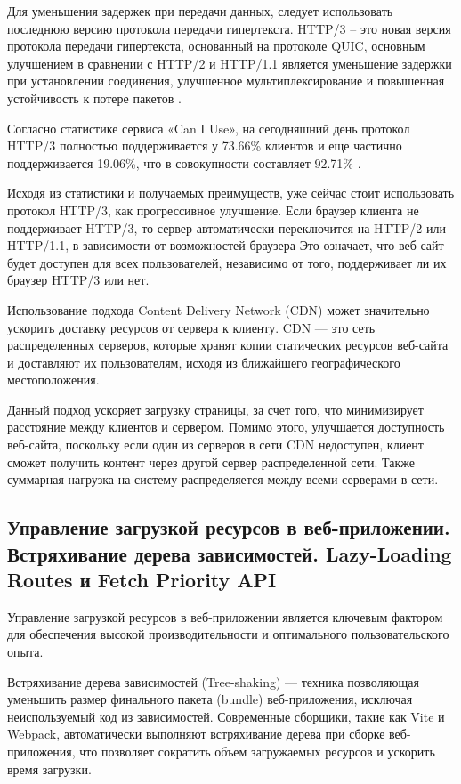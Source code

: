 Для уменьшения задержек при передачи данных, следует использовать последнюю версию протокола передачи гипертекста. HTTP/3 – это новая версия протокола передачи гипертекста, основанный на протоколе QUIC, основным улучшением в сравнении с HTTP/2 и HTTP/1.1 является уменьшение задержки при установлении соединения, улучшенное мультиплексирование и повышенная устойчивость к потере пакетов \cite{webserverhttp3}.

Согласно статистике сервиса «Can I Use», на сегодняшний день протокол HTTP/3 полностью поддерживается у 73.66\% клиентов и еще частично поддерживается 19.06\%, что в совокупности составляет 92.71\% \cite{caniusehttp3}.

Исходя из статистики и получаемых преимуществ, уже сейчас стоит использовать протокол HTTP/3, как прогрессивное улучшение. Если браузер клиента не поддерживает HTTP/3, то сервер автоматически переключится на HTTP/2 или HTTP/1.1, в зависимости от возможностей браузера Это означает, что веб-сайт будет доступен для всех пользователей, независимо от того, поддерживает ли их браузер HTTP/3 или нет.

Использование подхода Content Delivery Network (CDN) может значительно ускорить доставку ресурсов от сервера к клиенту. CDN — это сеть распределенных серверов, которые хранят копии статических ресурсов веб-сайта и доставляют их пользователям, исходя из ближайшего географического местоположения.

Данный подход ускоряет загрузку страницы, за счет того, что минимизирует расстояние между клиентов и сервером. Помимо этого, улучшается доступность веб-сайта, поскольку если один из серверов в сети CDN недоступен, клиент сможет получить контент через другой сервер распределенной сети. Также суммарная нагрузка на систему распределяется между всеми серверами в сети.

\subsection{Управление загрузкой ресурсов в веб-приложении. Встряхивание дерева зависимостей. Lazy-Loading Routes и Fetch Priority API}

Управление загрузкой ресурсов в веб-приложении является ключевым фактором для обеспечения высокой производительности и оптимального пользовательского опыта.

Встряхивание дерева зависимостей (Tree-shaking) — техника позволяющая уменьшить размер финального пакета (bundle) веб-приложения, исключая неиспользуемый код из зависимостей. Современные сборщики, такие как Vite и Webpack, автоматически выполняют встряхивание дерева при сборке веб-приложения, что позволяет сократить объем загружаемых ресурсов и ускорить время загрузки.

